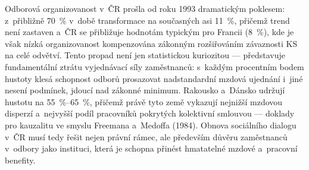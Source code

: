 Odborová organizovanost v~ČR prošla od roku 1993 dramatickým poklesem: z~přibližně \SI{70}{\percent} v~době transformace na současných asi \SI{11}{\percent}, přičemž trend není zastaven a~ČR se přibližuje hodnotám typickým pro Francii (\SI{8}{\percent}), kde je však nízká organizovanost kompenzována zákonným rozšiřováním závaznosti \ac{KS} na celé odvětví.
Tento propad není jen statistickou kuriozitou --- představuje fundamentální ztrátu vyjednávací síly zaměstnanců: s~každým procentním bodem hustoty klesá schopnost odborů prosazovat nadstandardní mzdová ujednání i~jiné nesení podmínek, jdoucí nad zákonné minimum.
Rakousko a~Dánsko udržují hustotu na \SIrange{55}{65}{\percent}, přičemž právě tyto země vykazují nejnižší mzdovou disperzí a~nejvyšší podíl pracovníků pokrytých kolektivní smlouvou --- doklady pro kauzalitu ve smyslu Freemana a~Medoffa (1984).
Obnova sociálního dialogu v~ČR musí tedy řešit nejen právní rámec, ale především důvěru zaměstnanců v~odbory jako instituci, která je schopna přinést hmatatelné mzdové a~pracovní benefity.


